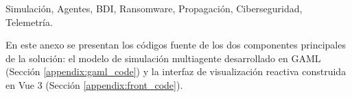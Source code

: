 \documentclass{ieeeaccess}
\begin{document}
\begin{keywords}
Simulación, Agentes, BDI, Ransomware, Propagación, Ciberseguridad, Telemetría.
\end{keywords}

\maketitle













\newpage
\onecolumn
{}
\label{appendix:source_code}
En este anexo se presentan los códigos fuente de los dos componentes principales de la solución: el modelo de simulación multiagente desarrollado en GAML (Sección \ref{appendix:gaml_code}) y la interfaz de visualización reactiva construida en Vue 3 (Sección \ref{appendix:front_code}).





\EOD
\end{document}
